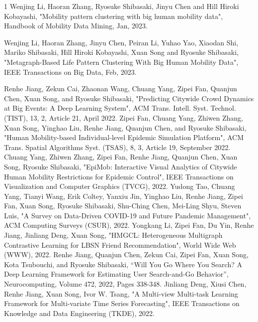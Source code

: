 \begin{雑誌論文}{1}
Wenjing Li, Haoran Zhang, Ryosuke Shibasaki,  Jinyu Chen and Hill Hiroki Kobayashi,  "Mobility pattern clustering with big human mobility data", Handbook of Mobility Data Mining, Jan, 2023.

Wenjing Li, Haoran Zhang, Jinyu Chen, Peiran Li, Yuhao Yao, Xiaodan Shi,  Mariko Shibasaki, Hill Hiroki Kobayashi, Xuan Song and Ryosuke Shibasaki,  "Metagraph-Based Life Pattern Clustering With Big Human Mobility Data", IEEE Transactions on Big Data, Feb, 2023.

Renhe Jiang, Zekun Cai, Zhaonan Wang, Chuang Yang, Zipei Fan, Quanjun Chen, Xuan Song, and Ryosuke Shibasaki, "Predicting Citywide Crowd Dynamics at Big Events: A Deep Learning System", ACM Trans. Intell. Syst. Technol. (TIST), 13, 2, Article 21, April 2022.
Zipei Fan, Chuang Yang, Zhiwen Zhang, Xuan Song, Yinghao Liu, Renhe Jiang, Quanjun Chen, and Ryosuke Shibasaki, "Human Mobility-based Individual-level Epidemic Simulation Platform", ACM Trans. Spatial Algorithms Syst. (TSAS), 8, 3, Article 19, September 2022.
Chuang Yang, Zhiwen Zhang, Zipei Fan, Renhe Jiang, Quanjun Chen, Xuan Song, Ryosuke Shibasaki, "EpiMob: Interactive Visual Analytics of Citywide Human Mobility Restrictions for Epidemic Control", IEEE Transactions on Visualization and Computer Graphics (TVCG), 2022.
Yudong Tao, Chuang Yang, Tianyi Wang, Erik Coltey, Yanxiu Jin, Yinghao Liu, Renhe Jiang, Zipei Fan, Xuan Song, Ryosuke Shibasaki, Shu-Ching Chen, Mei-Ling Shyu, Steven Luis, "A Survey on Data-Driven COVID-19 and Future Pandemic Management", ACM Computing Surveys (CSUR), 2022.
Yongkang Li, Zipei Fan, Du Yin, Renhe Jiang, Jinliang Deng, Xuan Song, "HMGCL: Heterogeneous Multigraph Contrastive Learning for LBSN Friend Recommendation", World Wide Web (WWW), 2022.
Renhe Jiang, Quanjun Chen, Zekun Cai, Zipei Fan, Xuan Song, Kota Tsubouchi, and Ryosuke Shibasaki, “Will You Go Where You Search? A Deep Learning Framework for Estimating User Search-and-Go Behavior”, Neurocomputing, Volume 472, 2022, Pages 338-348.
Jinliang Deng, Xiusi Chen, Renhe Jiang, Xuan Song, Ivor W. Tsang, "A Multi-view Multi-task Learning Framework for Multi-variate Time Series Forecasting", IEEE Transactions on Knowledge and Data Engineering (TKDE), 2022.




\end{雑誌論文}
